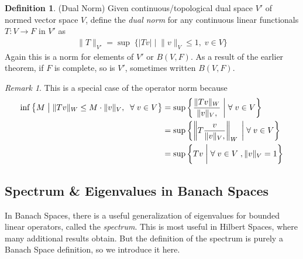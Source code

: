 \documentclass[12pt]{book}
\numberwithin{equation}{section} %
\theoremstyle{plain}
\theoremstyle{definition}
\newtheorem{defn}[thm]{Definition}
\theoremstyle{remark}
\newtheorem*{rmk}{Remark}
\newcommand{\ra}{\rightarrow}
\begin{document}
\begin{defn}(Dual Norm)
\label{defn:dualnorm}
Given continuous/topological dual space $V'$ of normed vector space $V$,
define the \emph{dual norm} for any continuous linear functionals
$T:V\ra F$ in $V'$ as
\begin{align*}
  \lVert
  T
  \rVert_{V'}
  =
  \sup
  \;
  \big\{
  |Tv|
  \;\big|\;
  \lVert v\rVert_V\leq 1,
  \;
  v\in V
  \big\}
\end{align*}
Again this is a norm for elements of $V'$ or $B(V,F)$.
As a result of the earlier theorem, if $F$ is complete, so is $V'$,
sometimes written $B(V,F)$.
\end{defn}
\begin{rmk}
This is a special case of the operator norm because
\begin{align*}
  \inf
  \big\{
    M
    \;\big|\;
    \lVert Tv\rVert_W
    \leq
    M
    \cdot
    \lVert v\rVert_V,
    \;\;
    \forall \; v\in V
  \big\}
  &=
  \sup
  \left\{
    \frac{%
      \lVert Tv\rVert_W
    }{%
      \lVert v\rVert_V,
    }
    \;\bigg|\;
    \forall \; v\in V
  \right\}
  \\
  &=
  \sup
  \left\{
    \left\lVert
    T
    \frac{%
      v
    }{%
      \lVert v\rVert_V,
    }
    \right\rVert_W
    \;\bigg|\;
    \forall \; v\in V
  \right\}
  \\
  &=
  \sup
  \left\{
    T
    v
    \;\bigg|\;
    \forall \; v\in V\;, \lVert v\rVert_V =1
  \right\}
\end{align*}
\end{rmk}




\clearpage
\subsection{Spectrum \& Eigenvalues in Banach Spaces}

In Banach Spaces, there is a useful generalization of eigenvalues for
bounded linear operators, called the \emph{spectrum}.
This is most useful in Hilbert Spaces, where many additional results
obtain.
But the definition of the spectrum is purely a Banach Space definition,
so we introduce it here.
\end{document}
